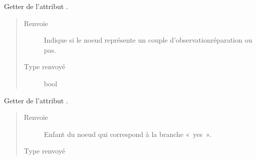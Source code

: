 \documentclass[letterpaper,10pt,french]{sphinxmanual}
\begin{document}
\begin{fulllineitems}

\begin{fulllineitems}
\label{\detokenize{index:StrategyTree.Observation.get_obs_rep_couples}}
Getter de l’attribut .
\begin{quote}\begin{description}
\item[{Renvoie}] \leavevmode
{} \textendash{} Indique si le noeud représente un couple d’observation\sphinxhyphen{}réparation
ou pas.

\item[{Type renvoyé}] \leavevmode
bool

\end{description}\end{quote}

\end{fulllineitems}


\begin{fulllineitems}
\label{\detokenize{index:StrategyTree.Observation.get_yes_child}}
Getter de l’attribut .
\begin{quote}\begin{description}
\item[{Renvoie}] \leavevmode
{} \textendash{} Enfant du noeud qui correspond à la branche « yes ».

\item[{Type renvoyé}] \leavevmode
{\hyperref[\detokenize{index:StrategyTree.NodeST}]{}}

\end{description}\end{quote}

\end{fulllineitems}



\end{fulllineitems}
\end{document}
